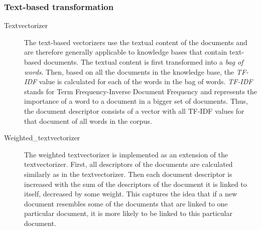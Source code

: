\subsubsection{Text-based transformation}
\begin{description}
\item [Textvectorizer] The text-based vectorizers use the textual content of the documents and are therefore generally applicable to knowledge bases that contain text-based documents. The textual content is first transformed into a \emph{bag of words}. Then, based on all the documents in the knowledge base, the \emph{TF-IDF} value is calculated for each of the words in the bag of words. \emph{TF-IDF} stands for Term Frequency-Inverse Document Frequency and represents the importance of a word to a document in a bigger set of documents. Thus, the document descriptor consists of a vector with all TF-IDF values for that document of all words in the corpus. 

\item[Weighted\_textvectorizer] The weighted textvectorizer is implemented as an extension of the textvectorizer. First, all descriptors of the documents are calculated similarly as in the textvectorizer. Then each document descriptor is increased with the sum of the descriptors of the document it is linked to itself, decreased by some weight. This captures the idea that if a new document resembles some of the documents that are linked to one particular document, it is more likely to be linked to this particular document. 
\end{description}

